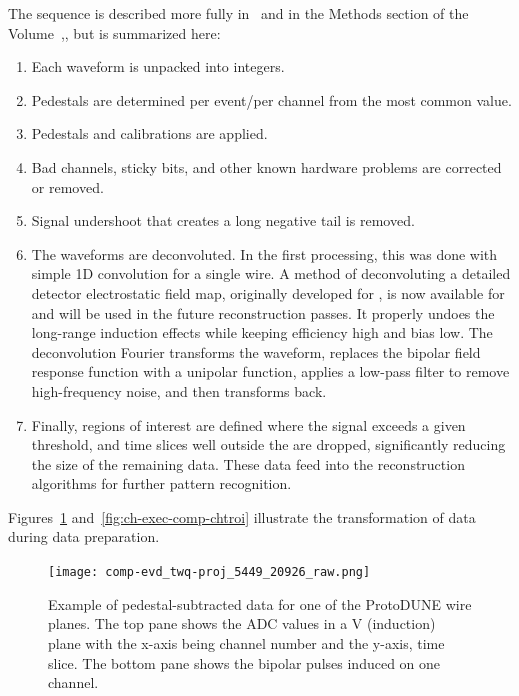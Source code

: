 The sequence is described more fully in~\cite{bib:docdb12349} and in the Methods section of the Volume~\volnumberphysics,\voltitlephysics{}, but is summarized here: 

\begin{enumerate}
\item Each waveform is unpacked into integers.
\item Pedestals are determined per event/per channel from the most common  value. 
\item Pedestals and calibrations are applied. %
\item Bad channels, sticky bits, and other known hardware problems are corrected or removed.
\item Signal undershoot that creates a long negative tail is removed. 
\item The waveforms  are deconvoluted.  In the first processing, this was done with simple 1D  convolution for a single wire.  A \twod  method of deconvoluting a detailed detector electrostatic field map, originally developed for \cite{Adams:2018dra}, is  now available for  and will be used in the future reconstruction passes.  It properly undoes the long-range induction effects while keeping efficiency high and bias low.  The deconvolution Fourier transforms the waveform, replaces the  bipolar field response function with a unipolar function, applies a low-pass filter to remove high-frequency noise, and then transforms back.





\item Finally, regions of interest are defined where the signal exceeds a given threshold, and time slices well outside the  are dropped, significantly reducing the size of the remaining data. These data feed into the reconstruction algorithms for further pattern recognition. %
\end{enumerate}


Figures~\ref{fig:ch-exec-comp-chtraw} and~\ref{fig:ch-exec-comp-chtroi} illustrate the transformation of  data  during data preparation.

\begin{figure}[t]
\texttt{[image: comp-evd\_twq-proj\_5449\_20926\_raw.png]}
\caption{Example of pedestal-subtracted data for one of the ProtoDUNE  wire planes.  The top pane shows the ADC values in a V (induction) plane with the x-axis being channel number and the y-axis, time slice. The bottom pane shows the bipolar pulses induced on one channel. 
}
\label{fig:ch-exec-comp-chtraw}
\end{figure}

